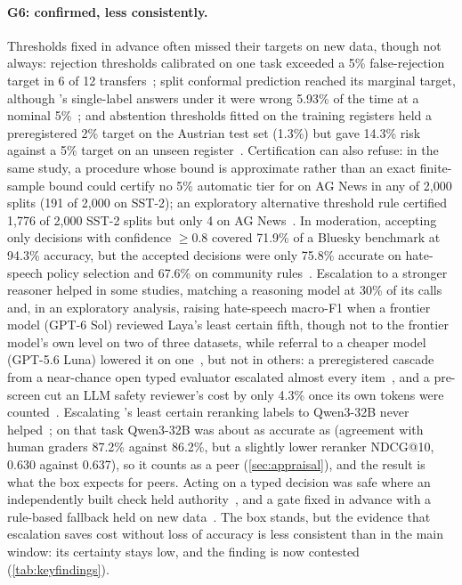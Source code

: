 \paragraph{G6: confirmed, less consistently.}
Thresholds fixed in advance often missed their targets on new data, though not always: rejection thresholds calibrated on one task exceeded a 5\% false-rejection target in 6 of 12 transfers~\cite{arx03387}; split conformal prediction reached its marginal target, although \jev{}'s single-label answers under it were wrong 5.93\% of the time at a nominal 5\%~\cite{zen22935043}\zmark{}; and abstention thresholds fitted on the training registers held a preregistered 2\% target on the Austrian test set (1.3\%) but gave 14.3\% risk against a 5\% target on an unseen register~\cite{zen23225893}\zmark{}.
Certification can also refuse: in the same study, a procedure whose bound is approximate rather than an exact finite-sample bound could certify no 5\% automatic tier for \jev{} on AG News in any of 2{,}000 splits (191 of 2{,}000 on SST-2); an exploratory alternative threshold rule certified 1{,}776 of 2{,}000 SST-2 splits but only 4 on AG News~\cite{zen22935043}\zmark{}.
In moderation, accepting only \jev{} decisions with confidence $\geq 0.8$ covered 71.9\% of a Bluesky benchmark at 94.3\% accuracy, but the accepted decisions were only 75.8\% accurate on hate-speech policy selection and 67.6\% on community rules~\cite{arx07953}.
Escalation to a stronger reasoner helped in some studies, matching a reasoning model at 30\% of its calls~\cite{arx09683} and, in an exploratory analysis, raising hate-speech macro-F1 when a frontier model (GPT-6 Sol) reviewed Laya's least certain fifth, though not to the frontier model's own level on two of three datasets, while referral to a cheaper model (GPT-5.6 Luna) lowered it on one~\cite{arx03324}, but not in others: a preregistered cascade from a near-chance open typed evaluator escalated almost every item~\cite{arx07177}, and a \jev{} pre-screen cut an LLM safety reviewer's cost by only 4.3\% once its own tokens were counted~\cite{arx02267}.
Escalating \jev{}'s least certain reranking labels to Qwen3-32B never helped~\cite{arx09188}; on that task Qwen3-32B was about as accurate as \jev{} (agreement with human graders 87.2\% against 86.2\%, but a slightly lower reranker NDCG@10, 0.630 against 0.637), so it counts as a peer (\cref{sec:appraisal}), and the result is what the box expects for peers.
Acting on a typed decision was safe where an independently built check held authority~\cite{arx07327}, and a gate fixed in advance with a rule-based fallback held on new data~\cite{zen23088660}\zmark{}.
The box stands, but the evidence that escalation saves cost without loss of accuracy is less consistent than in the main window: its certainty stays low, and the finding is now contested (\cref{tab:keyfindings}).

